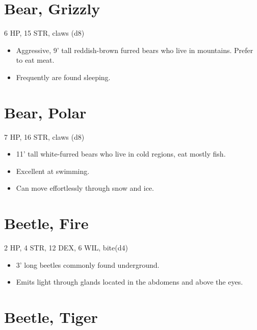 \documentclass[
  10pt,
  american,
]{article}
\begin{document}
\hypertarget{bear-grizzly}{%
\section{Bear, Grizzly}\label{bear-grizzly}}

6 HP, 15 STR, claws (d8)

\begin{samepage}
\begin{itemize}
\setlength\itemsep{-.5em}
\item Aggressive, 9’ tall reddish-brown furred bears who live in mountains.   Prefer to eat meat.
\item Frequently are found sleeping.
\end{itemize}
\end{samepage}

\hypertarget{bear-polar}{%
\section{Bear, Polar}\label{bear-polar}}

7 HP, 16 STR, claws (d8)

\begin{samepage}
\begin{itemize}
\setlength\itemsep{-.5em}
\item 11’ tall white-furred bears who live in cold regions, eat mostly fish.
\item Excellent at swimming.
\item Can move effortlessly through snow and ice.
\end{itemize}
\end{samepage}

\hypertarget{beetle-fire}{%
\section{Beetle, Fire}\label{beetle-fire}}

2 HP, 4 STR, 12 DEX, 6 WIL, bite(d4)

\begin{samepage}
\begin{itemize}
\setlength\itemsep{-.5em}
\item 3’ long beetles commonly found underground.
\item Emits light through glands located in the abdomens and above the eyes.
\end{itemize}
\end{samepage}

\hypertarget{beetle-tiger}{%
\section{Beetle, Tiger}\label{beetle-tiger}}
\end{document}
